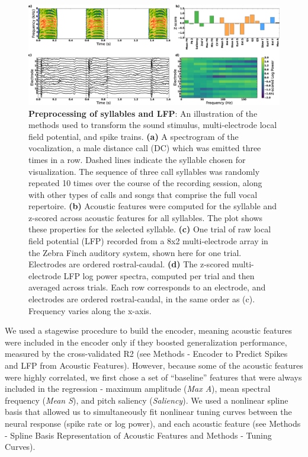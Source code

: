 \begin{figure}
    \caption{\textbf{Preprocessing of syllables and LFP}: An illustration of the methods used to transform the sound stimulus, multi-electrode local field potential, and spike trains. \textbf{(a)} A spectrogram of the vocalization, a male distance call (DC) which was emitted three times in a row. Dashed lines indicate the syllable chosen for visualization. The sequence of three call syllables was randomly repeated 10 times over the course of the recording session, along with other types of calls and songs that comprise the full vocal repertoire. \textbf{(b)} Acoustic features were computed for the syllable and z-scored across acoustic features for all syllables. The plot shows these properties for the selected syllable. \textbf{(c)} One trial of raw local field potential (LFP) recorded from a 8x2 multi-electrode array in the Zebra Finch auditory system, shown here for one trial. Electrodes are ordered rostral-caudal. \textbf{(d)} The z-scored multi-electrode LFP log power spectra, computed per trial and then averaged across trials. Each row corresponds to an electrode, and electrodes are ordered rostral-caudal, in the same order as (c). Frequency varies along the x-axis.
}
    \centering
    \includegraphics[scale=0.25]{figure4.eps}
\end{figure}

We used a stagewise procedure to build the encoder, meaning acoustic features were included in the encoder only if they boosted generalization performance, measured by the cross-validated R2 (see Methods - Encoder to Predict Spikes and LFP from Acoustic Features). However, because some of the acoustic features were highly correlated, we first chose a set of “baseline” features that were always included in the regression - maximum amplitude ({\em Max A}), mean spectral frequency ({\em Mean S}), and pitch saliency ({\em Saliency}). We used a nonlinear spline basis that allowed us to simultaneously fit nonlinear tuning curves between the neural response (spike rate or log power), and each acoustic feature (see Methods - Spline Basis Representation of Acoustic Features and Methods - Tuning Curves).

